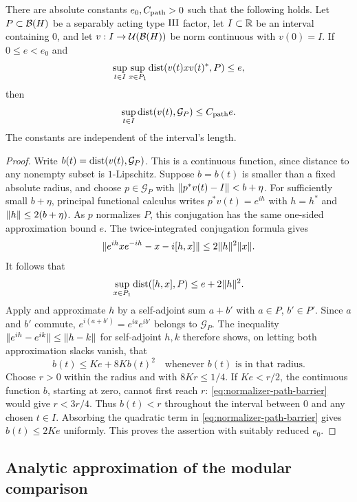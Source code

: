 \begin{lemma}
\label{lem:local-normalizer-path}
There are absolute constants $e_0,C_{\rm path}>0$ such that the
following holds. Let $P\subset\mathcal B(H)$ be a separably acting type
$\mathrm{III}$ factor,
let $I\subset\mathbb R$ be an interval containing $0$, and let
$v:I\to\mathcal U(\mathcal B(H))$ be norm continuous with $v(0)=I$.
If $0\le e<e_0$ and
\[
 \sup_{t\in I}\sup_{x\in P_1}\operatorname{dist}(v(t)xv(t)^*,P)\le e,
\]
then
\[
 \sup_{t\in I}\operatorname{dist}(v(t),\mathcal G_P)\le C_{\rm path}e.
\]
The constants are independent of the interval's length.
\end{lemma}

\begin{proof}
Write $b(t)=\operatorname{dist}(v(t),\mathcal G_P)$. This is a continuous
function, since distance to any nonempty subset is $1$-Lipschitz.
Suppose $b=b(t)$ is smaller than a fixed absolute radius, and
choose $p\in\mathcal G_P$ with $\lVert p^*v(t)-I\rVert<b+\eta$.
For sufficiently small $b+\eta$, principal functional calculus
writes $p^*v(t)=e^{ih}$ with $h=h^*$ and
$\lVert h\rVert\le2(b+\eta)$. As $p$ normalizes $P$, this conjugation
has the same one-sided approximation bound $e$.
The twice-integrated conjugation formula gives
\[
 \lVert e^{ih}xe^{-ih}-x-i[h,x]\rVert\le2\lVert h\rVert^2\lVert x\rVert.
\]
It follows that
\[
 \sup_{x\in P_1}\operatorname{dist}([h,x],P)\le e+2\lVert h\rVert^2.
\]
Apply  and approximate $h$ by
a self-adjoint sum $a+b'$ with $a\in P$, $b'\in P'$.
Since $a$ and $b'$ commute, $e^{i(a+b')}=e^{ia}e^{ib'}$ belongs
to $\mathcal G_P$. The inequality
$\lVert e^{ih}-e^{ik}\rVert\le\lVert h-k\rVert$ for self-adjoint $h,k$
therefore shows, on letting both approximation slacks vanish, that
\begin{equation}
 b(t)\le K e+8K b(t)^2
 \quad\text{whenever }b(t)\text{ is in that radius}.
 \label{eq:normalizer-path-barrier}
\end{equation}
Choose $r>0$ within the radius and with $8Kr\le1/4$.
If $Ke<r/2$, the continuous function $b$, starting at zero,
cannot first reach $r$: \eqref{eq:normalizer-path-barrier} would
give $r<3r/4$. Thus $b(t)<r$ throughout the interval between
$0$ and any chosen $t\in I$. Absorbing the quadratic term in
\eqref{eq:normalizer-path-barrier} gives $b(t)\le2Ke$ uniformly.
This proves the assertion with suitably reduced $e_0$.
\end{proof}

\subsection{Analytic approximation of the modular comparison}

